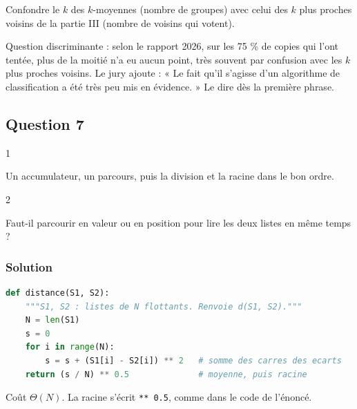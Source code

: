 \documentclass[11pt,a4paper]{article}
\begin{document}
\begin{piege}

Confondre le \(k\) des \(k\)-moyennes (nombre de groupes) avec celui des \(k\) plus proches voisins de la partie III (nombre de voisins qui votent).

\end{piege}

\begin{jury}

Question discriminante : selon le rapport 2026, sur les 75 \% de copies qui l'ont tentée, plus de la moitié n'a eu aucun point, très souvent par confusion avec les \(k\) plus proches voisins. Le jury ajoute : « Le fait qu'il s'agisse d'un algorithme de classification a été très peu mis en évidence. » Le dire dès la première phrase.

\end{jury}

\hypertarget{question-7}{%
\subsection{Question 7}\label{question-7}}

\begin{indication}{1}

Un accumulateur, un parcours, puis la division et la racine dans le bon ordre.

\end{indication}

\begin{indication}{2}

Faut-il parcourir en valeur ou en position pour lire les deux listes en même temps ?

\end{indication}

\hypertarget{solution-6}{%
\subsubsection{Solution}\label{solution-6}}

\begin{lstlisting}[language=Python]
def distance(S1, S2):
    """S1, S2 : listes de N flottants. Renvoie d(S1, S2)."""
    N = len(S1)
    s = 0
    for i in range(N):
        s = s + (S1[i] - S2[i]) ** 2   # somme des carres des ecarts
    return (s / N) ** 0.5              # moyenne, puis racine
\end{lstlisting}

Coût \(\Theta(N)\). La racine s'écrit \texttt{**\ 0.5}, comme dans le code de l'énoncé.
\end{document}
